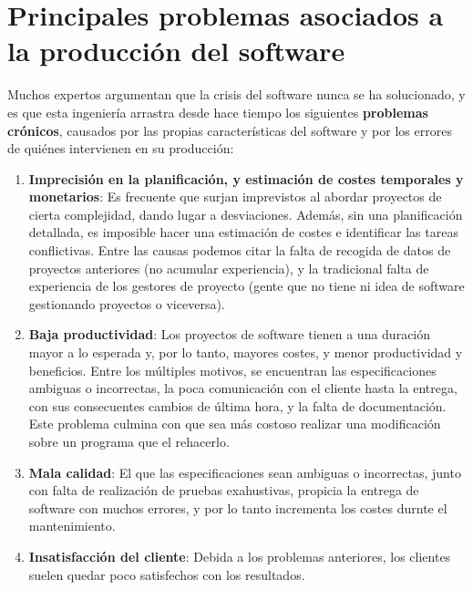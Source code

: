 \section{Principales problemas asociados a la producción del software}
Muchos expertos argumentan que la crisis del software nunca se ha solucionado, y es que esta ingeniería arrastra desde hace tiempo los siguientes \textbf{problemas crónicos}, causados por las propias características del software y por los errores de quiénes intervienen en su producción:
\begin{enumerate}
    \item \textbf{Imprecisión en la planificación, y estimación de costes temporales y monetarios}: Es frecuente que surjan imprevistos al abordar proyectos de cierta complejidad, dando lugar a desviaciones. Además, sin una planificación detallada, es imposible hacer una estimación de costes e identificar las tareas conflictivas. Entre las causas podemos citar la falta de recogida de datos de proyectos anteriores (no acumular experiencia), y la tradicional falta de experiencia de los gestores de proyecto (gente que no tiene ni idea de software gestionando proyectos o viceversa).
    \item \textbf{Baja productividad}: Los proyectos de software tienen a una duración mayor a lo esperada y, por lo tanto, mayores costes, y menor productividad y beneficios. Entre los múltiples motivos, se encuentran las especificaciones ambiguas o incorrectas, la poca comunicación con el cliente hasta la entrega, con sus consecuentes cambios de última hora, y la falta de documentación. Este problema culmina con que sea más costoso realizar una modificación sobre un programa que el rehacerlo.
    \item \textbf{Mala calidad}: El que las especificaciones sean ambiguas o incorrectas, junto con falta de realización de pruebas exahustivas, propicia la entrega de software con muchos errores, y por lo tanto incrementa los costes durnte el mantenimiento.
    \item \textbf{Insatisfacción del cliente}: Debida a los problemas anteriores, los clientes suelen quedar poco satisfechos con los resultados.
\end{enumerate}